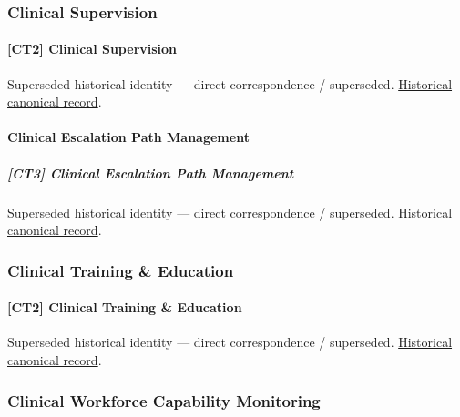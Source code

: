 \subsubsection{Clinical Supervision}

\paragraph{[CT2] Clinical Supervision}

\par\label{element:50c838981f3946d78e8f78d18e31c70c}
Superseded historical identity — direct correspondence / superseded. \href{../../../../continuum/strategy/capability/50c838981f3946d78e8f78d18e31c70c.md}{Historical canonical record}.\par

\paragraph{Clinical Escalation Path Management}

\subparagraph{[CT3] Clinical Escalation Path Management}

\par\label{element:759a2e52172345e8ad1bc96d7e5ddad3}
Superseded historical identity — direct correspondence / superseded. \href{../../../../continuum/strategy/capability/759a2e52172345e8ad1bc96d7e5ddad3.md}{Historical canonical record}.\par

\subsubsection{Clinical Training \& Education}

\paragraph{[CT2] Clinical Training \& Education}

\par\label{element:df8bff7df9c1469da16cac6a5eb2bf76}
Superseded historical identity — direct correspondence / superseded. \href{../../../../continuum/strategy/capability/df8bff7df9c1469da16cac6a5eb2bf76.md}{Historical canonical record}.\par

\subsubsection{Clinical Workforce Capability Monitoring}

